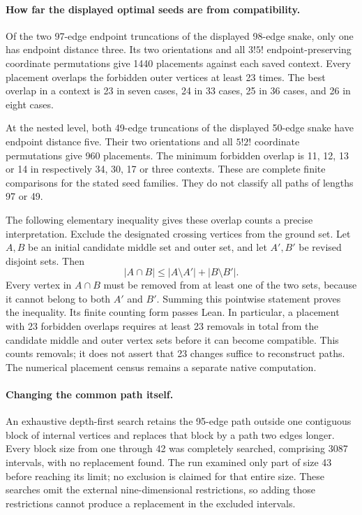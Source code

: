 \documentclass[11pt,a4paper]{article}
\theoremstyle{definition}
\theoremstyle{remark}
\begin{document}
\paragraph{How far the displayed optimal seeds are from compatibility.}
Of the two 97-edge endpoint truncations of the displayed 98-edge snake,
only one has endpoint distance three. Its two orientations and all
$3!5!$ endpoint-preserving coordinate permutations give 1440 placements
against each saved context. Every placement overlaps the forbidden
outer vertices at least 23 times. The best overlap in a context is
23 in seven cases, 24 in 33 cases, 25 in 36 cases, and 26 in eight cases.

At the nested level, both 49-edge truncations of the displayed 50-edge
snake have endpoint distance five. Their two orientations and all
$5!2!$ coordinate permutations give 960 placements. The minimum
forbidden overlap is 11, 12, 13 or 14 in respectively 34, 30, 17 or
three contexts. These are complete finite comparisons for the stated
seed families. They do not classify all paths of lengths 97 or 49.

The following elementary inequality gives these overlap counts a
precise interpretation. Exclude the designated crossing vertices from
the ground set. Let $A,B$ be an initial candidate middle set and outer
set, and let $A',B'$ be revised disjoint sets. Then
\[
\boxed{|A\cap B|\le |A\setminus A'|+|B\setminus B'|.}
\]
Every vertex in $A\cap B$ must be removed from at least one of the two
sets, because it cannot belong to both $A'$ and $B'$. Summing this
pointwise statement proves the inequality. Its finite counting form
passes Lean. In particular, a placement with 23 forbidden overlaps
requires at least 23 removals in total from the candidate middle and
outer vertex sets before it can become compatible. This counts removals;
it does not assert that 23 changes suffice to reconstruct paths.
The numerical placement census remains a separate native computation.

\paragraph{Changing the common path itself.}
An exhaustive depth-first search retains the 95-edge path outside one
contiguous block of internal vertices and replaces that block by a path
two edges longer. Every block size from one through 42 was completely
searched, comprising 3087 intervals, with no replacement found.
The run examined only part of size 43 before reaching its limit; no
exclusion is claimed for that entire size. These searches omit the
external nine-dimensional restrictions, so adding those restrictions
cannot produce a replacement in the excluded intervals.
\end{document}
